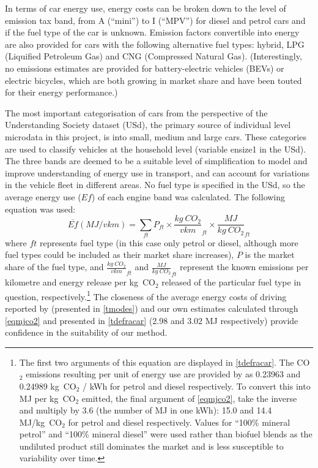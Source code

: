 \documentclass[a4paper, 11pt, twoside]{Thesis}
\begin{document}
In terms of car energy use,
energy costs can be broken down to the level of
emission tax band, from A (``mini'') to I (``MPV'') for diesel and petrol
cars and if the fuel type of the car is unknown. Emission factors
convertible into energy are also provided for cars with the following
alternative fuel types: hybrid, LPG (Liquified Petroleum Gas)
and CNG (Compressed Natural Gas). (Interestingly, no emissions estimates
are provided for battery-electric vehicles (BEVs) or electric
bicycles, which are both growing in market share and have been touted for
their energy performance.) 

The most important categorisation of cars from the perspective of the Understanding
Society dataset (USd), the primary source of individual level microdata in this project,
is into small, medium and large cars. These categories are used
to classify vehicles at the household level (variable ensize1 in the USd).
The three bands are deemed to be a suitable level of simplification to model and improve
understanding of energy use in transport, and can account for variations
in the vehicle fleet in different areas. No fuel type is specified in
the USd, so the average energy use ($Ef$) of each engine band was calculated.
The following equation was used:
\begin{equation}
\overline{Ef} (MJ/vkm) = \displaystyle{\sum_{ft}}
P_{ft} \times
\frac{kg~CO_{2}}{vkm}_{ft} \times \frac{MJ}{kg~CO_2}_{ft}
\label{eqmjco2}
\end{equation}
where $ft$ represents fuel type (in this case only petrol or diesel, although
more fuel types could be included as their market share increases), $P$ is the
market share of the fuel type, and $\frac{kg~CO_{2}}{vkm}_{ft}$ and $\frac{MJ}{kg~CO_2}_{ft}$
represent the known emissions per kilometre and energy release per kg~CO$_2$ released
of the particular fuel type in question,
respectively.\footnote{The
first two arguments of this equation are displayed
in \cref{tdefracar}. The CO$_2$ emissions resulting per unit of energy use
are provided by \citep[Table 1c]{Defra2011} as 0.23963 and 0.24989
kg~CO$_2$ / kWh for petrol and diesel respectively. To convert this into
MJ per kg~CO$_2$ emitted, the final argument of \cref{eqmjco2}, take the inverse
and multiply by 3.6 (the number of MJ in one kWh): 15.0 and 14.4 MJ/kg~CO$_2$
for petrol and diesel respectively. Values for ``100\% mineral petrol''
and ``100\% mineral diesel''
were used rather than biofuel blends as the undiluted product still dominates
the market and is less susceptible to variability over time.
}
The closeness of the average energy costs of driving reported by \citet{MacKay2009}
(presented in \cref{tmodes}) and our own estimates calculated through \cref{eqmjco2}
and presented in \cref{tdefracar} (2.98 and 3.02 MJ respectively) provide confidence
in the suitability of our method.
 
\end{document}
